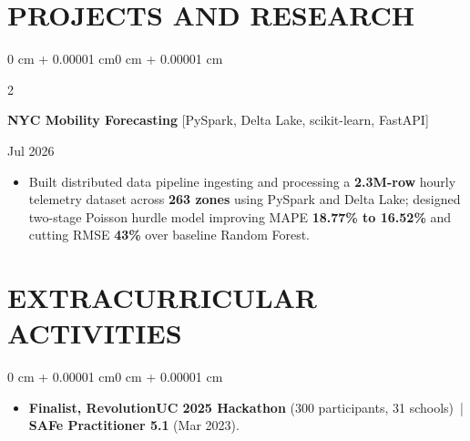 \documentclass[10pt, letterpaper]{article}
\newenvironment{highlights}{
    \begin{itemize}[
        topsep=0.10 cm,
        parsep=0.06 cm,
        partopsep=0pt,
        itemsep=0.06 cm,
        leftmargin=12pt
    ]
}{
    \end{itemize}
}
\newenvironment{onecolentry}{
    \begin{adjustwidth}{0 cm + 0.00001 cm}{0 cm + 0.00001 cm}
}{
    \end{adjustwidth}
}
\newenvironment{twocolentry}[2][]{
    \onecolentry
    \def\secondColumn{#2}
    \setcolumnwidth{\fill, 4.5 cm}
    \begin{paracol}{2}
}{
    \switchcolumn \raggedleft \secondColumn
    \end{paracol}
    \endonecolentry
}
\begin{document}
\section{PROJECTS AND RESEARCH}
\begin{twocolentry}{Jul 2026}
\textbf{NYC Mobility Forecasting} [PySpark, Delta Lake, scikit-learn, FastAPI]
\end{twocolentry}
\begin{highlights}
  \item Built distributed data pipeline ingesting and processing a \textbf{2.3M-row} hourly telemetry dataset across \textbf{263 zones} using PySpark and Delta Lake; designed two-stage Poisson hurdle model improving MAPE \textbf{18.77\% to 16.52\%} and cutting RMSE \textbf{43\%} over baseline Random Forest.
\end{highlights}

\section{EXTRACURRICULAR ACTIVITIES}
\begin{onecolentry}
\begin{highlights}
  \item \textbf{Finalist, RevolutionUC 2025 Hackathon} (300 participants, 31 schools) \,|\, \textbf{SAFe Practitioner 5.1} (Mar 2023).
\end{highlights}
\end{onecolentry}
\end{document}
